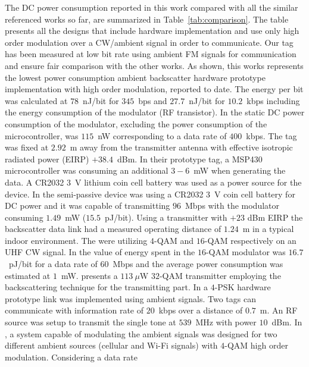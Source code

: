 \documentclass[journal]{IEEEtran}
\begin{document}
The DC power consumption reported in this work compared
 with  all the similar referenced works so far, are summarized in  Table~\ref{tab:comparison}. 
 The table presents all the designs 
that include hardware implementation  and use only high order modulation over a CW/ambient signal in order to communicate.
%
Our tag has been measured at low bit rate using ambient FM signals for communication and ensure fair comparison with the other works.
%
As shown, this works represents the lowest power consumption ambient backscatter hardware prototype implementation with high order modulation, reported to date.
%
The energy per bit was calculated  at $78$~nJ/bit for $345$~bps  and $27.7$~nJ/bit for $10.2$~kbps 
including the  energy consumption of the  modulator (RF transistor). 
%
In \cite{thomas2012quadrature} the static DC power consumption of the modulator,
excluding the power consumption of the microcontroller, was  $115$~nW corresponding to a data rate of
$400$~kbps.
%
The tag was fixed at $2.92$~m away from the transmitter  antenna with effective isotropic radiated power (EIRP)  $+38.4$~dBm.
%
In their prototype tag, a MSP430 microcontroller  was consuming an additional  $3-6$~mW
when generating the  data. 
%
A CR2032 $3$~V lithium coin cell battery was used  as a power source for the device.
%
In \cite{thomas201296} the semi-passive device was using a CR2032 $3$~V coin cell battery for DC power  and it was capable of transmitting $96$~Mbps with the modulator consuming  $1.49$~mW ($15.5$~pJ/bit).
% 
Using a transmitter with $+23$ dBm EIRP 
the backscatter data link had a measured operating distance of $1.24$~m in a typical indoor environment.
%
The \cite{thomas2012quadrature, thomas201296} were utilizing $4$-QAM and $16$-QAM respectively on an UHF CW signal. 
%
In \cite{correia2017quadrature} the value of energy
spent in the $16$-QAM  modulator was $16.7$~pJ/bit  for a data rate of $60$~Mbps  and the average power consumption was estimated at $1$~mW. 
%
\cite{shirane201513} presents a $113~\mu$W
$32$-QAM transmitter employing the  backscattering technique for the transmitting part. 
%
In \cite{qian2018iot} a $4$-PSK hardware prototype link  was implemented using ambient signals.
%
Two tags can communicate with information rate of $20$~kbps over a distance of $0.7$~m.
%
An RF source was  setup to transmit the single tone at $539$~MHz with power $10$~dBm.
%
 In \cite{correia2018dual},  a system capable of modulating the ambient signals was designed  for two different ambient sources (cellular and Wi-Fi signals) with $4$-QAM high order modulation. 
% 
Considering a data rate
\end{document}
